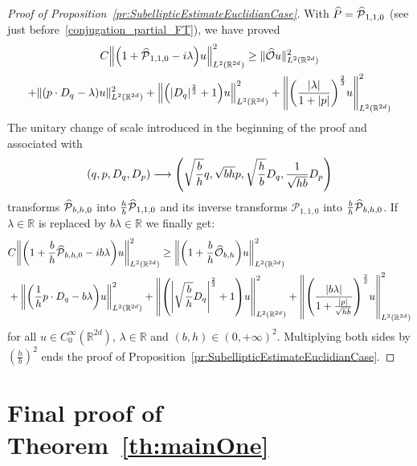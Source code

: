 \documentclass[AHL,Unicode,longabstracts]{cedram}
\newcommand{\R}{\mathbb{R}}
\newcommand{\clO}{\mathcal{O}}
\newcommand{\clP}{\mathcal{P}}
\let\oldhat\hat
\renewcommand*{\hat}[1]{\mathchoice{\widehat{#1}}{\widehat{#1}}{\oldhat{#1}}{\oldhat{#1}}}
\let\originalleft\left
\let\originalright\right
\renewcommand{\left}{\mathopen{}\mathclose\bgroup\originalleft}
\renewcommand{\right}{\aftergroup\egroup\originalright}
\renewcommand*{\to}{\mathchoice{\longrightarrow}{\rightarrow}{\rightarrow}{\rightarrow}}
\begin{document}
\begin{proof}[{Proof of Proposition~\ref{pr:SubellipticEstimateEuclidianCase}}]
With $\hat{P}=\hat{\clP}_{1,1,0}$ (see just before~\eqref{conjugation_partial_FT}), we have proved
\begin{multline*}
C\left\| \left(1+\hat{\clP}_{1,1,0}-i\lambda\right)u\right\|^{2}_{L^2(\R^{2d})} \geq \| \hat{\clO}u\|^{2}_{L^2(\R^{2d})}\\
+ \| (p\cdot D_{q}-\lambda)u\|^{2}_{L^2(\R^{2d})}
+ \left\|\left(|D_{q}|^{\frac{2}{3}}+1\right)u\right\|^{2}_{L^2(\R^{2d})} +
\left\|
\left(
\frac{|\lambda|}{1+|p|}
\right)^{\frac{2}{3}} u
\right\|^{2}_{L^2(\R^{2d})}
\end{multline*}
The unitary change of scale introduced in the beginning of the proof and associated with
\[
(q,p,D_q,D_p) \to\left(\sqrt{\frac{b}{h}}q, \sqrt{bh}p, \sqrt{\frac{h}{b}} D_q, \frac{1}{\sqrt{hb}}D_p\right)
\]
transforms $\hat{\clP}_{b,h,0}$ into $\frac{h}{b}\hat{\clP}_{1,1,0}$ and its inverse transforms $\clP_{1,1,0}$ into $\frac{b}{h}\hat{\clP}_{b,h,0}$. If $\lambda\in\R$ is replaced by $b\lambda\in\R$ we finally get:
\begin{align*}
&C\left\| \left(1+\frac{b}{h}\hat{\clP}_{b,h,0}-ib\lambda\right)u \right\|^{2}_{L^2(\R^{2d})} \geq
\left\| \left(1+\frac{b}{h}\hat{\clO}_{b,h}\right)u\right\|^{2}_{L^2(\R^{2d})}\\&+\left\|\left(\frac{1}{h}p\cdot D_{q}-b\lambda\right)u\right\|^{2}_{L^2(\R^{2d})}
+ \left\|\left(\left|\sqrt{\frac{b}{h}}D_{q}\right|^{\frac{2}{3}}+1\right)u\right\|^{2}_{L^2(\R^{2d})} +
\left\|
\left(
\frac{|b\lambda|}{1+\frac{|p|}{\sqrt{hb}}}
\right)^{\frac{2}{3}} u
\right\|^{2}_{L^2(\R^{2d})}
\end{align*}
for all $u \in C^\infty_0(\R^{2d})$, $\lambda \in \R$ and $(b,h)\in(0,+\infty)^{2}$. Multiplying both sides by $(\frac{h}{b})^2$ ends the proof of Proposition~\ref{pr:SubellipticEstimateEuclidianCase}.
\end{proof}



\section{Final proof of Theorem~\ref{th:mainOne}}\label{sec:finalproof}
\end{document}
